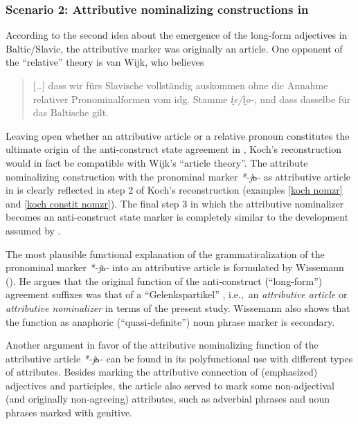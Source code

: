 \subsubsection{Scenario 2: Attributive nominalizing constructions in } 
According to the second idea about the emergence of the long-form adjectives in Baltic\slash{}Slavic, the attributive marker was originally an article. One opponent of the “relative” theory is van Wijk, who believes 
\begin{quote}
[\dots] dass wir fürs Slavische vollständig auskommen ohne die Annahme relativer Pronominalformen vom idg. Stamme \textit{i̭e/i̭o-}, und dass dasselbe für das Baltische gilt. \citep[28]{wijk1935}%
\end{quote}
Leaving open whether an attributive article or a relative pronoun constitutes the ultimate origin of the anti\hyp{}construct state agreement in , Koch's reconstruction would in fact be compatible with Wijk's “article theory”. The attribute nominalizing construction with the pronominal marker \textit{*-jь-} as attributive article in  is clearly reflected in step 2 of Koch's reconstruction (examples \ref{koch nomzr} and \ref{koch constit nomzr}). The final step 3 in which the attributive nominalizer becomes an anti\hyp{}construct state marker is completely similar to the development assumed by \cite{wijk1935}.

The most plausible functional explanation of the grammaticalization of the pronominal marker \textit{*-jь-} into an attributive article is formulated by Wissemann (\citeyear{wissemann1958}). He argues that the original function of the anti\hyp{}construct (“long-form”) agreement suffixes was that of a “Gelenkspartikel” \citep[76]{wissemann1958}, i.e.,~an \textit{attributive article} or \textit{attributive nominalizer} in terms of the present study. Wissemann also shows that the function as anaphoric (“quasi-definite”) noun phrase marker is secondary.

Another argument in favor of the attributive nominalizing function of the  attributive article \textit{*-jь-} can be found in its polyfunctional use with different types of attributes. Besides marking the attributive connection of (emphasized) adjectives and participles, the article also served to mark some non-adjectival (and originally non-agreeing) attributes, such as adverbial phrases and noun phrases marked with genitive.

